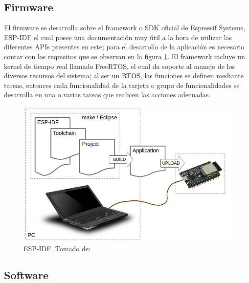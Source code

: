 \subsection{Firmware}

El firmware se desarrolla sobre el framework o SDK oficial de Espressif Systems, ESP-IDF el cual posee una documentación \cite{ES} muy útil a la hora de utilizar las diferentes APIs presentes en este; para el desarrollo de la aplicación es necesario contar con los requisitos que se observan en la figura \ref{fig:what-you-need}. El framework incluye un kernel de tiempo real llamado FreeRTOS, el cual da soporte al manejo de los diversos recursos del sistema; al ser un RTOS, las funciones se definen mediante tareas, entonces cada funcionalidad de la tarjeta o grupo de funcionalidades se desarrolla en una o varias tareas que realicen las acciones adecuadas.\\

\begin{figure}[!t]
	\centering
	\caption{ESP-IDF. Tomado de: \cite{ES}}
	\label{fig:what-you-need}
	\includegraphics[width=0.7\linewidth]{Imagenes/what-you-need}
\end{figure}

\subsection{Software}

